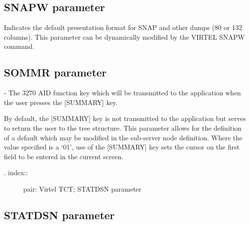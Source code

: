 \documentclass[letterpaper,10pt,english]{sphinxmanual}
\begin{document}
\subsection{SNAPW parameter}
\label{\detokenize{Installation_Guide:snapw-parameter}}
\begin{sphinxVerbatim}[commandchars=\\\{\}]
 
\end{sphinxVerbatim}

Indicates the default presentation format for SNAP and other dumps (80 or 132 columns). This parameter can be dynamically modified by the VIRTEL SNAPW command.


\subsection{SOMMR parameter}
\label{\detokenize{Installation_Guide:sommr-parameter}}
\begin{sphinxVerbatim}[commandchars=\\\{\}]
 
\end{sphinxVerbatim}

 - The 3270 AID function key which will be transmitted to the application when the user presses the {[}SUMMARY{]} key.

By default, the {[}SUMMARY{]} key is not transmitted to the application but serves to return the user to the tree structure. This parameter allows for the definition of a default which may be modified in the sub-server node definition. Where the value specified is a ‘01’, use of the {[}SUMMARY{]} key sets the cursor on the first field to be entered in the current screen.
\begin{description}
\item[{. index::}] \leavevmode
pair: Virtel TCT; STATDSN parameter

\end{description}


\subsection{STATDSN parameter}
\label{\detokenize{Installation_Guide:statdsn-parameter}}
\begin{sphinxVerbatim}[commandchars=\\\{\}]
 
\end{sphinxVerbatim}
\end{document}
